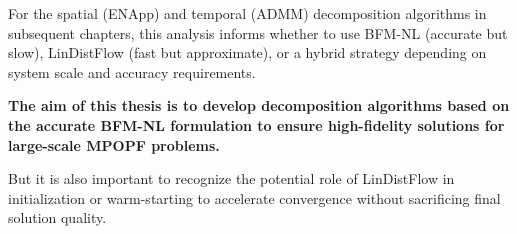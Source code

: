 For the spatial (ENApp) and temporal (ADMM) decomposition algorithms in subsequent chapters, this analysis informs whether to use BFM-NL (accurate but slow), LinDistFlow (fast but approximate), or a hybrid strategy depending on system scale and accuracy requirements.

\textbf{The aim of this thesis is to develop decomposition algorithms based on the accurate BFM-NL formulation to ensure high-fidelity solutions for large-scale MPOPF problems.}

But it is also important to recognize the potential role of LinDistFlow in initialization or warm-starting to accelerate convergence without sacrificing final solution quality.

